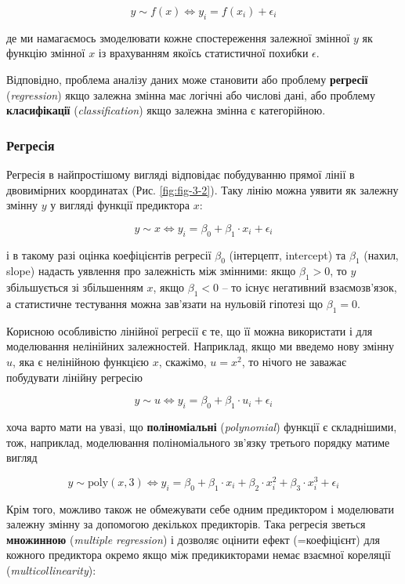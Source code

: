 \documentclass[
  11pt,
]{book}
\begin{document}
\[y \sim f(x) \Longleftrightarrow y_i = f(x_i) + \epsilon_i\]

де ми намагаємось змоделювати кожне спостереження залежної змінної \(y\) як функцію змінної \(x\) із врахуванням якоїсь статистичної похибки \(\epsilon\).

Відповідно, проблема аналізу даних може становити або проблему \textbf{регресії} (\emph{regression}) якщо залежна змінна має логічні або числові дані, або проблему \textbf{класифікації} (\emph{classification}) якщо залежна змінна є категорійною.

\subsubsection{Регресія}\label{ux440ux435ux433ux440ux435ux441ux456ux44f}

Регресія в найпростішому вигляді відповідає побудуванню прямої лінії в двовимірних координатах (Рис. \ref{fig:fig-3-2}). Таку лінію можна уявити як залежну змінну \(y\) у вигляді функції предиктора \(x\):

\[y \sim x \Longleftrightarrow y_i = \beta_0 + \beta_1 \cdot x_i + \epsilon_i\]

і в такому разі оцінка коефіцієнтів регресії \(\beta_0\) (інтерцепт, intercept) та \(\beta_1\) (нахил, slope) надасть уявлення про залежність між змінними: якщо \(\beta_1 > 0\), то \(y\) збільшується зі збільшенням \(x\), якщо \(\beta_1 < 0\) -- то існує негативний взаємозв'язок, а статистичне тестування можна зав'язати на нульовій гіпотезі що \(\beta_1 = 0\).

Корисною особливістю лінійної регресії є те, що її можна використати і для моделювання нелінійних залежностей. Наприклад, якщо ми введемо нову змінну \(u\), яка є нелінійною функцією \(x\), скажімо, \(u = x^2\), то нічого не заважає побудувати лінійну регресію

\[y \sim u \Longleftrightarrow y_i = \beta_0 + \beta_1 \cdot u_i + \epsilon_i\]

хоча варто мати на увазі, що \textbf{поліноміальні} (\emph{polynomial}) функції є складнішими, тож, наприклад, моделювання поліноміального зв'язку третього порядку матиме вигляд

\[y \sim \text{poly}(x, 3) \Longleftrightarrow y_i = \beta_0 + \beta_1 \cdot x_i + \beta_2 \cdot x_i^2 + \beta_3 \cdot x_i^3 + \epsilon_i\]

Крім того, можливо також не обмежувати себе одним предиктором і моделювати залежну змінну за допомогою декількох предикторів. Така регресія зветься \textbf{множинною} (\emph{multiple regression}) і дозволяє оцінити ефект (=коефіцієнт) для кожного предиктора окремо якщо між предикикторами немає взаємної кореляції (\emph{multicollinearity}):
\end{document}
